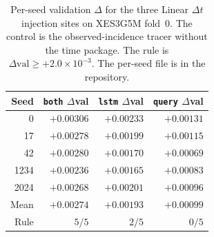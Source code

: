 \begin{table}[H]
\caption{Per-seed validation $\Delta$ for the three Linear $\Delta t$
injection sites on XES3G5M fold~0. The control is the observed-incidence
tracer without the time package. The rule is
$\Delta\mathrm{val}\ge{+}2.0\times 10^{-3}$. The per-seed file is in
the repository.}
\label{tab:a7-query-dt-seeds}
\centering
\footnotesize
\begin{tabular}{@{}rrrr@{}}
\toprule
Seed & \texttt{both} $\Delta$val & \texttt{lstm} $\Delta$val & \texttt{query} $\Delta$val \\
\midrule
0 & $+0.00306$ & $+0.00233$ & $+0.00131$ \\
17 & $+0.00278$ & $+0.00199$ & $+0.00115$ \\
42 & $+0.00280$ & $+0.00170$ & $+0.00069$ \\
1234 & $+0.00236$ & $+0.00165$ & $+0.00083$ \\
2024 & $+0.00268$ & $+0.00201$ & $+0.00096$ \\
\midrule
Mean & $+0.00274$ & $+0.00193$ & $+0.00099$ \\
Rule & $5/5$ & $2/5$ & $0/5$ \\
\bottomrule
\end{tabular}
\end{table}
